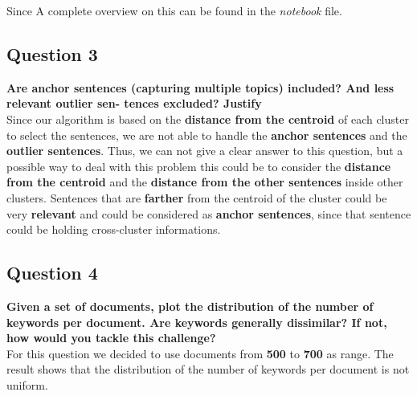 Since A complete overview on this can be found in the \textit{notebook} file.

\subsection{Question 3}
\textbf{ Are anchor sentences (capturing multiple topics) included? And less relevant outlier sen- tences excluded? Justify} \\
Since our algorithm is based on the \textbf{distance from the centroid} of each
cluster to select the sentences, we are not able to handle the \textbf{anchor
  sentences} and the \textbf{outlier sentences}. Thus, we can not give a clear
answer to this question, but a possible way to deal with this problem this could be to consider
the \textbf{distance from the centroid} and the \textbf{distance from the other
  sentences} inside other clusters. Sentences that are \textbf{farther} from the
centroid of the cluster could be very \textbf{relevant} and could be considered
as \textbf{anchor sentences}, since that sentence could be holding cross-cluster informations.

\subsection{Question 4}
\textbf{Given a set of documents, plot the distribution of the number of keywords per document. Are keywords generally dissimilar? If not, how would you tackle this challenge?} \\
For this question we decided to use documents from \textbf{500} to \textbf{700} as range.
The result shows that the distribution of the number of keywords per
document is not uniform.

